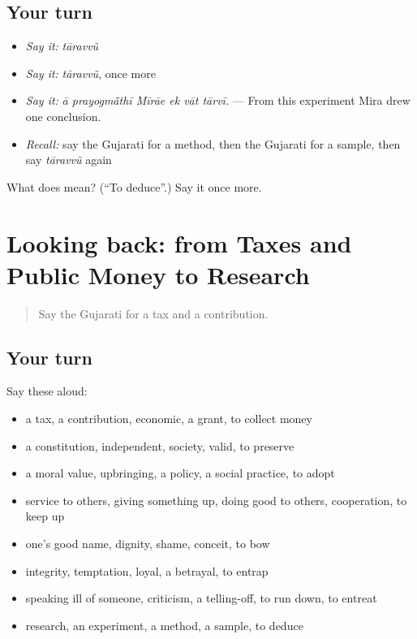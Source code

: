 \subsection*{Your turn}
\begin{itemize}
\raggedright
  \item \emph{Say it:} \emph{tāravvũ}
  \item \emph{Say it:} \emph{tāravvũ}, once more
  \item \emph{Say it:} \emph{ā prayogmā̃thī Mīrāe ek vāt tārvī.} — From this experiment Mira drew one conclusion.
  \item \emph{Recall:} say the Gujarati for a method, then the Gujarati for a sample, then say \emph{tāravvũ} again
\end{itemize}

\begin{tcolorbox}[breakable,colback=teal!4,colframe=teal!35!black,title={Before you move on}]
What does  mean? (\textquotedblleft{}To deduce\textquotedblright{}.) Say it once more.
\end{tcolorbox}
\section[(dialogue)]{Looking back: from Taxes and Public Money to Research}

\label{lesson:GU-R362-review-355-362}



\begin{quote}
Say the Gujarati for a tax and a contribution.
\end{quote}

\subsection*{Your turn}
Say these aloud:

\begin{itemize}
\raggedright
  \item a tax, a contribution, economic, a grant, to collect money
  \item a constitution, independent, society, valid, to preserve
  \item a moral value, upbringing, a policy, a social practice, to adopt
  \item service to others, giving something up, doing good to others, cooperation, to keep up
  \item one's good name, dignity, shame, conceit, to bow
  \item integrity, temptation, loyal, a betrayal, to entrap
  \item speaking ill of someone, criticism, a telling-off, to run down, to entreat
  \item research, an experiment, a method, a sample, to deduce
\end{itemize}

